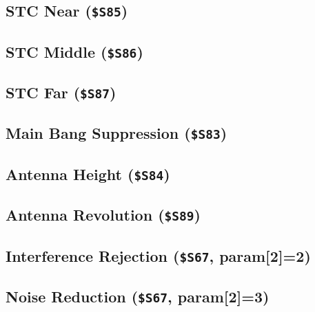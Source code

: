 \documentclass[11pt,letterpaper]{article}
\begin{document}

\subsection{STC Near (\texttt{\$S85})}
\label{subsec:cmd-stc-near}


\subsection{STC Middle (\texttt{\$S86})}
\label{subsec:cmd-stc-middle}


\subsection{STC Far (\texttt{\$S87})}
\label{subsec:cmd-stc-far}


\subsection{Main Bang Suppression (\texttt{\$S83})}
\label{subsec:cmd-main-bang}


\subsection{Antenna Height (\texttt{\$S84})}
\label{subsec:cmd-antenna-height}


\subsection{Antenna Revolution (\texttt{\$S89})}
\label{subsec:cmd-antenna-revolution}


\subsection{Interference Rejection (\texttt{\$S67}, param[2]=2)}
\label{subsec:cmd-ir}


\subsection{Noise Reduction (\texttt{\$S67}, param[2]=3)}
\label{subsec:cmd-noise}
\end{document}
